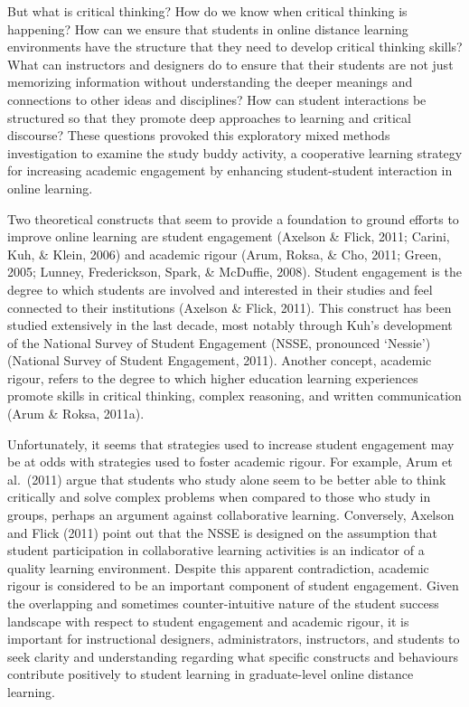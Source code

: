 \documentclass[
]{book}
\theoremstyle{definition}
\theoremstyle{definition}
\theoremstyle{definition}
\theoremstyle{definition}
\theoremstyle{remark}
\begin{document}
But what is critical thinking? How do we know when critical thinking is happening? How can we ensure that students in online distance learning environments have the structure that they need to develop critical thinking skills? What can instructors and designers do to ensure that their students are not just memorizing information without understanding the deeper meanings and connections to other ideas and disciplines? How can student interactions be structured so that they promote deep approaches to learning and critical discourse? These questions provoked this exploratory mixed methods investigation to examine the study buddy activity, a cooperative learning strategy for increasing academic engagement by enhancing student-student interaction in online learning.

Two theoretical constructs that seem to provide a foundation to ground efforts to improve online learning are student engagement (Axelson \& Flick, 2011; Carini, Kuh, \& Klein, 2006) and academic rigour (Arum, Roksa, \& Cho, 2011; Green, 2005; Lunney, Frederickson, Spark, \& McDuffie, 2008). Student engagement is the degree to which students are involved and interested in their studies and feel connected to their institutions (Axelson \& Flick, 2011). This construct has been studied extensively in the last decade, most notably through Kuh's development of the National Survey of Student Engagement (NSSE, pronounced `Nessie') (National Survey of Student Engagement, 2011). Another concept, academic rigour, refers to the degree to which higher education learning experiences promote skills in critical thinking, complex reasoning, and written communication (Arum \& Roksa, 2011a).

Unfortunately, it seems that strategies used to increase student engagement may be at odds with strategies used to foster academic rigour. For example, Arum et al.~(2011) argue that students who study alone seem to be better able to think critically and solve complex problems when compared to those who study in groups, perhaps an argument against collaborative learning. Conversely, Axelson and Flick (2011) point out that the NSSE is designed on the assumption that student participation in collaborative learning activities is an indicator of a quality learning environment. Despite this apparent contradiction, academic rigour is considered to be an important component of student engagement. Given the overlapping and sometimes counter-intuitive nature of the student success landscape with respect to student engagement and academic rigour, it is important for instructional designers, administrators, instructors, and students to seek clarity and understanding regarding what specific constructs and behaviours contribute positively to student learning in graduate-level online distance learning.
\end{document}
